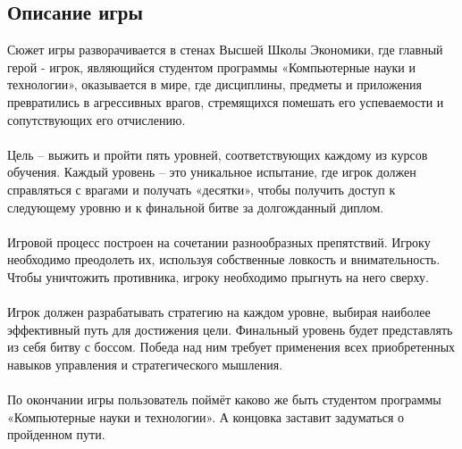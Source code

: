 \documentclass{article}
\begin{document}
\subsection*{Описание игры}

\begin{enumerate}
    Сюжет игры разворачивается в стенах Высшей Школы Экономики, где главный герой - игрок, являющийся студентом программы «Компьютерные науки и технологии», оказывается в мире, где дисциплины, предметы и приложения превратились в агрессивных врагов, стремящихся помешать его успеваемости и сопутствующих его отчислению.\\  
    \\Цель – выжить и пройти пять уровней, соответствующих каждому из курсов обучения. Каждый уровень – это уникальное испытание, где игрок должен справляться с врагами и получать «десятки», чтобы получить доступ к следующему уровню и к финальной битве за долгожданный диплом.\\
    \\Игровой процесс построен на сочетании разнообразных препятствий. Игроку необходимо преодолеть их, используя собственные ловкость и внимательность. Чтобы уничтожить противника, игроку необходимо прыгнуть на него сверху.\\
    \\Игрок должен разрабатывать стратегию на каждом уровне, выбирая наиболее эффективный путь для достижения цели. Финальный уровень будет представлять из себя битву с боссом. Победа над ним требует применения всех приобретенных навыков управления и стратегического мышления.\\
    \\По окончании игры пользователь поймёт каково же быть студентом программы «Компьютерные науки и технологии». А концовка заставит задуматься о пройденном пути.
\end{enumerate}
\end{document}
